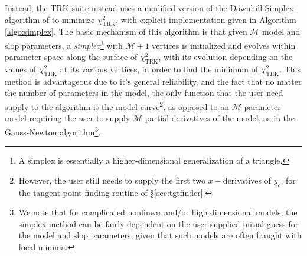Instead, the TRK suite instead uses a modified version of the Downhill Simplex algorithm of \textcite{NelderMead65} to minimize $\chi^2_\text{TRK}$, with explicit implementation given in Algorithm \ref{algo:simplex}. The basic mechanism of this algorithm is that given $\mathcal{M}$ model and slop parameters, a \textit{simplex}\footnote{A simplex is essentially a higher-dimensional generalization of a triangle.} with $\mathcal{M}+1$ vertices is initialized and evolves within parameter space along the surface of $\chi^2_\text{TRK}$, with its evolution depending on the values of $\chi^2_\text{TRK}$ at its various vertices, in order to find the minimum of $\chi^2_\text{TRK}$. This method is advantageous due to it's general reliability, and the fact that no matter the number of parameters in the model, the only function that the user need supply to the algorithm is the model curve\footnote{However, the user still needs to supply the first two $x-$derivatives of $y_c$, for the tangent point-finding routine of \S\ref{sec:tgtfinder}.}, as opposed to an $\mathcal{M}$-parameter model requiring the user to supply $\mathcal{M}$ partial derivatives of the model, as in the Gauss-Newton algorithm\footnote{We note that for complicated nonlinear and/or high dimensional models, the simplex method can be fairly dependent on the user-supplied initial guess for the model and slop parameters, given that such models are often fraught with local minima.}. 
